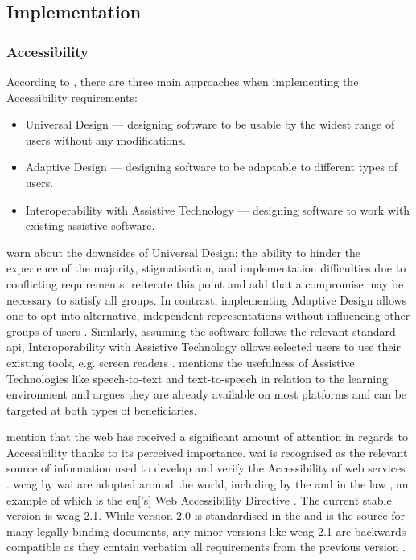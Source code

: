\subsection{Implementation}
\label{Literature-HSIE-Implementation}

\subsubsection{Accessibility}

According to \textcite[p. 296]{Wegge_Zimmermann_2007}, there are three main approaches when implementing the Accessibility requirements:

\begin{itemize}
    \item Universal Design --- designing software to be usable by the widest range of users without any modifications.
    \item Adaptive Design --- designing software to be adaptable to different types of users.
    \item Interoperability with Assistive Technology --- designing software to work with existing assistive software.
\end{itemize}

\textcite{Wegge_Zimmermann_2007} warn about the downsides of Universal Design: the ability to hinder the experience of the majority, stigmatisation, and implementation difficulties due to conflicting requirements.
\textcite{Juergen_et_all_2020} reiterate this point and add that a compromise may be necessary to satisfy all groups.
In contrast, implementing Adaptive Design allows one to opt into alternative, independent representations without influencing other groups of users \parencite{Wegge_Zimmermann_2007}.
Similarly, assuming the software follows the relevant standard \gls{api}, Interoperability with Assistive Technology allows selected users to use their existing tools, e.g. screen readers \parencite{Wegge_Zimmermann_2007}.
\textcite{Edyburn_2021} mentions the usefulness of Assistive Technologies like speech-to-text and text-to-speech in relation to the learning environment and argues they are already available on most platforms and can be targeted at both types of beneficiaries.

\textcite{Juergen_et_all_2020} mention that the web has received a significant amount of attention in regards to Accessibility thanks to its perceived importance.
\gls{wai} is recognised as the relevant source of information used to develop and verify the Accessibility of web services \parencite{WAI_Intro}.
\gls{wcag} by \gls{wai} are adopted around the world, including by the \textcite{ISO_40500:2012} and in the law \parencite{WAI_Policies}, an example of which is the \gls{eu}['s] Web Accessibility Directive \parencite{EU_Web_Accessibility}.
The current stable version is \gls{wcag} 2.1. While version 2.0 is standardised in the \textcite{ISO_40500:2012} and is the source for many legally binding documents, any minor versions like \gls{wcag} 2.1 are backwards compatible as they contain verbatim all requirements from the previous version \parencite{WAI_WCAG}.

